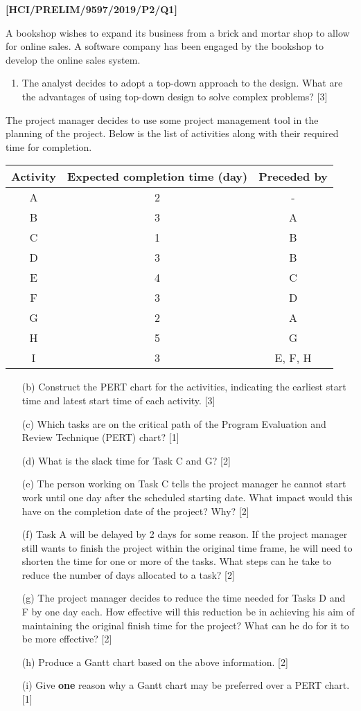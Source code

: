 \item \textbf{{[}HCI/PRELIM/9597/2019/P2/Q1{]} }

A bookshop wishes to expand its business from a brick and mortar shop
to allow for online sales. A software company has been engaged by
the bookshop to develop the online sales system. 
\begin{enumerate}
\item The analyst decides to adopt a top-down approach to the design. What
are the advantages of using top-down design to solve complex problems?\hfill{}
{[}3{]} 
\end{enumerate}
The project manager decides to use some project management tool in
the planning of the project. Below is the list of activities along
with their required time for completion.
\noindent \begin{center}
\begin{tabular}{|c|c|c|}
\hline 
Activity & Expected completion time (day) & Preceded by\tabularnewline
\hline 
\hline 
A & 2 & -\tabularnewline
\hline 
B & 3 & A\tabularnewline
\hline 
C & 1 & B\tabularnewline
\hline 
D & 3 & B\tabularnewline
\hline 
E & 4 & C\tabularnewline
\hline 
F & 3 & D\tabularnewline
\hline 
G & 2 & A\tabularnewline
\hline 
H & 5 & G\tabularnewline
\hline 
I & 3 & E, F, H\tabularnewline
\hline 
\end{tabular}
\par\end{center}
\begin{enumerate}
\item[(b)]  Construct the PERT chart for the activities, indicating the earliest
start time and latest start time of each activity. \hfill{}{[}3{]}
\item[(c)]  Which tasks are on the critical path of the Program Evaluation and
Review Technique (PERT) chart? \hfill{}{[}1{]}
\item[(d)]  What is the slack time for Task C and G? \hfill{}{[}2{]}
\item[(e)]  The person working on Task C tells the project manager he cannot
start work until one day after the scheduled starting date. What impact
would this have on the completion date of the project? Why?\hfill{}
{[}2{]}
\item[(f)]  Task A will be delayed by 2 days for some reason. If the project
manager still wants to finish the project within the original time
frame, he will need to shorten the time for one or more of the tasks.
What steps can he take to reduce the number of days allocated to a
task? \hfill{}{[}2{]}
\item[(g)]  The project manager decides to reduce the time needed for Tasks
D and F by one day each. How effective will this reduction be in achieving
his aim of maintaining the original finish time for the project? What
can he do for it to be more effective?\hfill{} {[}2{]}
\item[(h)]  Produce a Gantt chart based on the above information. \hfill{}{[}2{]}
\item[(i)]  Give \textbf{one} reason why a Gantt chart may be preferred over
a PERT chart.\hfill{} {[}1{]}
\end{enumerate}
